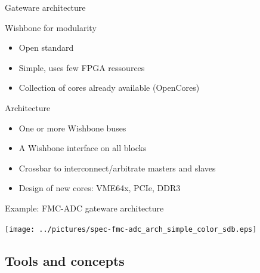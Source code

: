 \documentclass[compress,red]{beamer}
\begin{document}
\begin{frame}{Gateware architecture}

  \begin{block}{Wishbone for modularity}
    \begin{itemize}
    \item Open standard
    \item Simple, uses few FPGA ressources
    \item Collection of cores already available (OpenCores)
    \end{itemize}
  \end{block}

  \begin{block}{Architecture}
    \begin{itemize}
    \item One or more Wishbone buses
    \item A Wishbone interface on all blocks
    \item Crossbar to interconnect/arbitrate masters and slaves %
    \item Design of new cores: VME64x, PCIe, DDR3
    \end{itemize}
  \end{block}

  \note[item]{}

\end{frame}

\begin{frame}{Example: FMC-ADC gateware architecture}

  \begin{center}
    \texttt{[image: ../pictures/spec-fmc-adc\_arch\_simple\_color\_sdb.eps]}
  \end{center}

  \note[item]{}

\end{frame}


\subsection{Tools and concepts}
\end{document}
